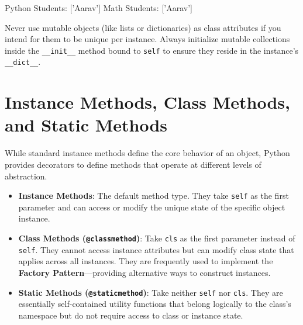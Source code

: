 \begin{outputbox}
Python Students: ['Aarav']
Math Students: ['Aarav']
\end{outputbox}

\begin{commonmistake}
Never use mutable objects (like lists or dictionaries) as class attributes if you intend for them to be unique per instance. Always initialize mutable collections inside the \texttt{\_\_init\_\_} method bound to \texttt{self} to ensure they reside in the instance's \texttt{\_\_dict\_\_}.
\end{commonmistake}

\section{Instance Methods, Class Methods, and Static Methods}

While standard instance methods define the core behavior of an object, Python provides decorators to define methods that operate at different levels of abstraction. 

\begin{itemize}[leftmargin=1.5em]
    \item \textbf{Instance Methods}: The default method type. They take \texttt{self} as the first parameter and can access or modify the unique state of the specific object instance.
    \item \textbf{Class Methods (\texttt{@classmethod})}: Take \texttt{cls} as the first parameter instead of \texttt{self}. They cannot access instance attributes but can modify class state that applies across all instances. They are frequently used to implement the \textbf{Factory Pattern}---providing alternative ways to construct instances.
    \item \textbf{Static Methods (\texttt{@staticmethod})}: Take neither \texttt{self} nor \texttt{cls}. They are essentially self-contained utility functions that belong logically to the class's namespace but do not require access to class or instance state.
\end{itemize}

